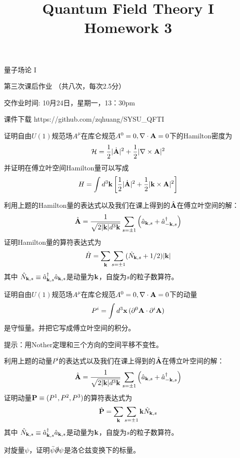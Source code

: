 \documentclass[CJK]{beamer}
\title{Quantum Field Theory I \\ Homework 3}
\author{}
\date{}
\begin{document}
\begin{frame}
 
\begin{center}
\begin{Large}
\bch
量子场论 I 

{\vskip 0.3in}

第三次课后作业 （共八次，每次2.5分）

交作业时间: 10月24日，星期一，13：30pm

\ech
\end{Large}
\end{center}

\vskip 0.2in

\bch
课件下载
\ech
https://github.com/zqhuang/SYSU\_QFTI

\end{frame}

\begin{frame}
\bch
证明自由$U(1)$规范场$A^\mu$在库仑规范$A^0=0, \nabla\cdot {\mathbf{A}}=0$下的Hamilton密度为
$${\mathcal{H}} = \frac{1}{2}|\dot{{\mathbf{A}}}|^2 + \frac{1}{2}|\nabla\times {\mathbf{A}}|^2$$
并证明在傅立叶空间Hamilton量可以写成
$$H = \int d^3{\mathbf{k}}\left[\frac{1}{2}|\dot{{\mathbf{A}}}|^2 + \frac{1}{2}|{\mathbf{k}} \times {\mathbf{A}}|^2\right]$$
\ech
\end{frame}

\begin{frame}
\bch
利用上题的Hamilton量的表达式以及我们在课上得到的$\hat{{\mathbf{A}}}$在傅立叶空间的解：
$$\hat{{\mathbf{A}}} = \frac{1}{\sqrt{2|{\mathbf{k}}|d^3{\mathbf{k}}}}\sum_{s=\pm 1} \left({\hat{a}}_{{\mathbf{k}}, s} + {\hat{a}^\dagger}_{-{\mathbf{k}}, s}\right)$$
证明Hamilton量的算符表达式为
$$\hat{H} = \sum_{{\mathbf{k}}} \sum_{s=\pm 1}(\hat{N}_{{\mathbf{k}},s}+1/2)|{\mathbf{k}}|$$
其中 $\hat{N}_{{\mathbf{k}}, s} \equiv {\hat{a}^\dagger}_{{\mathbf{k}},s}{\hat{a}}_{{\mathbf{k}}, s}$是动量为${\mathbf{k}}$，自旋为$s$的粒子数算符。
\ech
\end{frame}

\begin{frame}
\bch
证明自由$U(1)$规范场$A^\mu$在库仑规范$A^0=0, \nabla\cdot {\mathbf{A}}=0$下的动量
$$P^i = \int d^3{\mathbf{x}}\, (\partial^0{\mathbf{A}} \cdot \partial^i{\mathbf{A}})$$
是守恒量。并把它写成傅立叶空间的积分。
\skipline
\skipline

提示：用Nother定理和三个方向的空间平移不变性。 
\ech
\end{frame}


\begin{frame}
\bch
利用上题的动量$P^i$的表达式以及我们在课上得到的$\hat{{\mathbf{A}}}$在傅立叶空间的解：
$$\hat{{\mathbf{A}}} = \frac{1}{\sqrt{2|{\mathbf{k}}|d^3{\mathbf{k}}}}\sum_{s=\pm 1} \left({\hat{a}}_{{\mathbf{k}}, s} + {\hat{a}^\dagger}_{-{\mathbf{k}}, s}\right)$$
证明动量${\mathbf{P}} \equiv (P^1, P^2, P^3)$的算符表达式为
$$\hat{{\mathbf{P}}} = \sum_{{\mathbf{k}}}\sum_{s = \pm 1} {\mathbf{k}} \hat{N}_{{\mathbf{k}}, s}$$
其中 $\hat{N}_{{\mathbf{k}}, s} \equiv {\hat{a}^\dagger}_{{\mathbf{k}},s}{\hat{a}}_{{\mathbf{k}}, s}$是动量为${\mathbf{k}}$，自旋为$s$的粒子数算符。
\ech
\end{frame}


\begin{frame}
\bch
对旋量$\psi$，证明$\bar\psi\slashed{\partial}\psi$是洛仑兹变换下的标量。
\ech
\end{frame}
\end{document}
